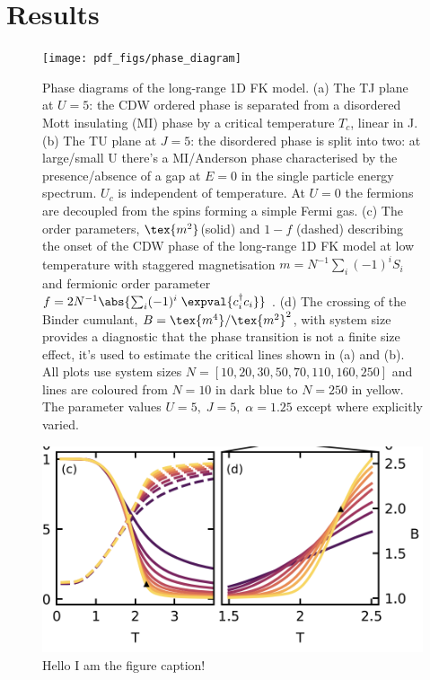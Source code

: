 \hypertarget{sec:FK-results}{%
\section{Results}\label{sec:FK-results}}

\begin{figure}
\hypertarget{fig:phase_diagram}{%
\centering
\texttt{[image: pdf\_figs/phase\_diagram]}
\caption{Phase diagrams of the long-range 1D FK model. (a) The TJ plane at \(U = 5\): the {CDW} ordered phase is separated from a disordered Mott insulating (MI) phase by a critical temperature \(T_c\), linear in J. (b) The TU plane at \(J = 5\): the disordered phase is split into two: at large/small U there's a MI/Anderson phase characterised by the presence/absence of a gap at \(E=0\) in the single particle energy spectrum. \(U_c\) is independent of temperature. At \(U = 0\) the fermions are decoupled from the spins forming a simple Fermi gas. (c) The order parameters, \(\tex{m^2}\)(solid) and \(1 - f\) (dashed) describing the onset of the {CDW} phase of the long-range 1D {FK} model at low temperature with staggered magnetisation \(m = N^{-1} \sum_i (-1)^i S_i\) and fermionic order parameter \(f = 2 N^{-1}\abs{\sum_i (-1)^i \; \expval{c^\dag_{i}c_{i}}}\) . (d) The crossing of the Binder cumulant, \(B = \tex{m^4} / \tex{m^2}^2\), with system size provides a diagnostic that the phase transition is not a finite size effect, it's used to estimate the critical lines shown in (a) and (b). All plots use system sizes \(N = [10,20,30,50,70,110,160,250]\) and lines are coloured from \(N = 10\) in dark blue to \(N = 250\) in yellow. The parameter values \(U = 5,\;J = 5,\;\alpha = 1.25\) except where explicitly varied.}\label{fig:phase_diagram}
}
\end{figure}

\hypertarget{fig:binder}{%
\begin{figure}
\centering
\includegraphics[width=1\textwidth,height=\textheight]{figure_code/fk_chapter/binder.png}
\caption[{no title}]{Hello I am the figure caption!}
\label{fig:binder}
\end{figure}
}

